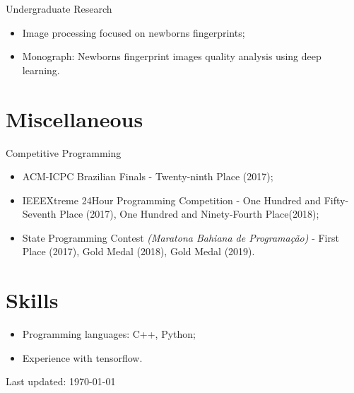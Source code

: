 \documentclass[letterpaper]{article}
\def\footerlink{}
\begin{document}
  Undergraduate Research
  \begin{itemize}
    \item Image processing focused on newborns fingerprints;
    \item Monograph: Newborns fingerprint images quality analysis using deep learning.
  \end{itemize}


\section*{Miscellaneous}

Competitive Programming

\begin{itemize}
  \item ACM-ICPC Brazilian Finals - Twenty-ninth Place (2017);
  \item IEEEXtreme 24Hour Programming Competition - One Hundred and Fifty-Seventh Place (2017), One Hundred and Ninety-Fourth Place(2018);
  \item State Programming Contest \textit{(Maratona Bahiana de Programação)} - First Place (2017), Gold Medal (2018), Gold Medal (2019).
\end{itemize}

\section*{Skills}
\begin{itemize}
  \item Programming languages: C++, Python;
  \item Experience with tensorflow.
\end{itemize}

\bigskip

\begin{center}
  \begin{footnotesize}
    Last updated: \today \\
    \href{\footerlink}{\texttt{\footerlink}}
  \end{footnotesize}
\end{center}
\end{document}
